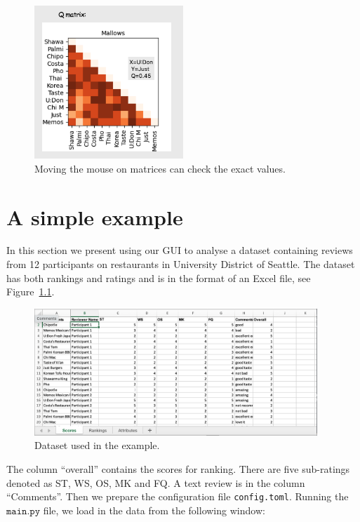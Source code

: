 \documentclass[a4paper,11pt]{memoir}
\begin{document}
  \begin{figure}[h]
    \begin{center}
      \includegraphics[width=0.5\textwidth]{art/q_matrix.png}
      \caption{Moving the mouse on matrices can check the exact values.}\label{fig:Qmatrix}
    \end{center}
  \end{figure}


\chapter{A simple example}

In this section we present using our GUI to analyse a dataset containing reviews from 12 participants on restaurants in University District of Seattle.
The dataset has both rankings and ratings and is in the format of an Excel file, see 
Figure~\ref{fig:example0}.

  \begin{figure}[h]
    \begin{center}
      \includegraphics[width=0.95\textwidth]{art/example_data.png}
      \caption{Dataset used in the example.}\label{fig:example0}
    \end{center}
  \end{figure}

The column ``overall'' contains the scores for ranking. There are five sub-ratings denoted as ST, WS, OS, MK and FQ. A text review is in the column ``Comments''.
Then we prepare the configuration file \texttt{config.toml}.
Running the $\texttt{main.py}$ file, 
we load in the data from the following window:
\end{document}
